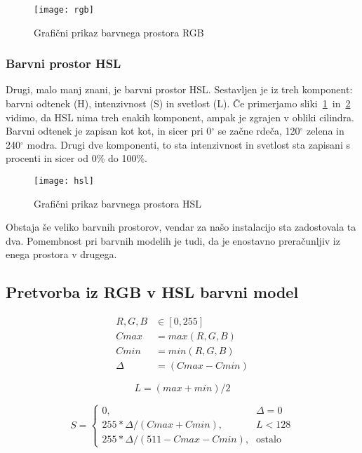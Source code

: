 \begin{figure}[!ht]
    \centering
    \texttt{[image: rgb]}
    \caption{Grafični prikaz barvnega prostora RGB}
    \label{fig:rgb}
\end{figure}


\subsubsection*{Barvni prostor HSL}
Drugi, malo manj znani, je barvni prostor HSL. Sestavljen je iz treh
komponent: barvni odtenek (H), intenzivnost (S) in svetlost (L). Če primerjamo
sliki~\ref{fig:rgb}~in~\ref{fig:hsl} vidimo, da HSL nima treh enakih
komponent, ampak je zgrajen v obliki cilindra. Barvni odtenek je zapisan kot
kot, in sicer pri 0$^{\circ}$ se začne rdeča, 120$^{\circ}$ zelena in
240$^{\circ}$ modra. Drugi dve komponenti, to sta intenzivnost in svetlost sta
zapisani s procenti in sicer od 0\% do 100\%.

\begin{figure}[!ht]
    \centering
    \texttt{[image: hsl]}
    \caption{Grafični prikaz barvnega prostora HSL}
    \label{fig:hsl}
\end{figure}

Obstaja še veliko barvnih prostorov, vendar za našo instalacijo sta
zadostovala ta dva. Pomembnost pri barvnih modelih je tudi, da je enostavno
preračunljiv iz enega prostora v drugega.


\subsection{Pretvorba iz RGB v HSL barvni model}
\label{sec:hslconvert}

\begin{align}
R, G, B &\in [0,255] \nonumber \\
Cmax &= max(R, G, B) \\
Cmin &= min(R, G, B) \\
\Delta &= (Cmax - Cmin)
\end{align}

\begin{equation}
L = (max + min) / 2 \label{eq:hsl_l}
\end{equation}

\begin{equation}
S =
\begin{cases}
    0 \text{,}& \Delta = 0 \\
    255 * \Delta / (Cmax + Cmin) \text{,}& L < 128 \\
    255 * \Delta / (511 - Cmax - Cmin) \text{,}& \text{ostalo}
\end{cases}
\end{equation}

